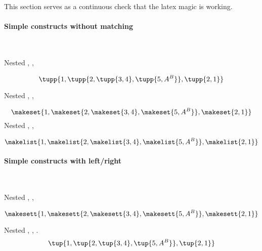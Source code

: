 This section serves as a continuous check that the latex magic is working.

\paragraph{Simple constructs without matching}~

Nested \str{\tupp}, \str{\tupp}, \str{\tupp}

\begin{equation}
    \tupp{ 1, \tupp{2, \tupp{3, 4}, \tupp{5, A^B}}, \tupp{2,1}}
\end{equation}

Nested \str{\makeset}, \str{\makeset}, \str{\makeset}

\begin{equation}
    \makeset{ 1, \makeset{2, \makeset{3, 4}, \makeset{5, A^B}}, \makeset{2,1}}
\end{equation}
Nested \str{\makelist}, \str{\makelist}, \str{\makelist}

\begin{equation}
    \makelist{ 1, \makelist{2, \makelist{3, 4}, \makelist{5, A^B}}, \makelist{2,1}}
\end{equation}

\paragraph{Simple constructs with left/right}~

Nested \str{\makesett}, \str{\makesett}, \str{\makesett}

\begin{equation}
    \makesett{ 1, \makesett{2, \makesett{3, 4}, \makesett{5, A^B}}, \makesett{2,1}}
\end{equation}

Nested \str{\tup}, \str{\tup}, \str{\tup}.
\begin{equation}
    \tup{1, \tup{2, \tup{3, 4}, \tup{5, A^B}}, \tup{2,1}}
\end{equation}

